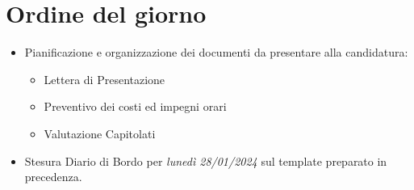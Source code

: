 \section{Ordine del giorno}

\begin{itemize}
    \item Pianificazione e organizzazione dei documenti da presentare alla candidatura:
    \begin{itemize}
        \renewcommand{\labelitemii}{--}
        \item Lettera di Presentazione
        \item Preventivo dei costi ed impegni orari
        \item Valutazione Capitolati
    \end{itemize}
    \item Stesura Diario di Bordo per \emph{lunedì 28/01/2024} sul template preparato in precedenza.
\end{itemize}